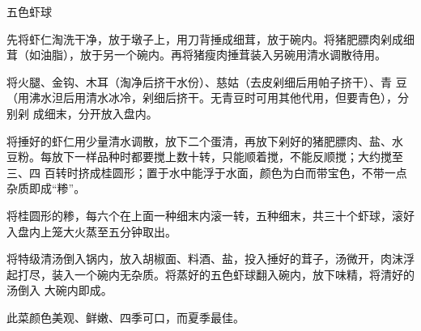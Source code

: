 \begin{recipe}{五色虾球}

\ingredients


\preparation

\step 先将虾仁淘洗干净，放于墩子上，用刀背捶成细茸，放于碗内。将猪肥膘肉剁成细
茸（如油脂），放于另一个碗内。再将猪瘦肉捶茸装入另碗用清水调散待用。

\step 将火腿、金钩、木耳（淘净后挤干水份）、慈姑（去皮剁细后用帕子挤干）、青
豆（用沸水泹后用清水冰冷，剁细后挤干。无青豆时可用其他代用，但要青色），分别剁
成细末，分开放入盘内。

\step 将捶好的虾仁用少量清水调散，放下二个蛋清，再放下剁好的猪肥膘肉、盐、水
豆粉。每放下一样品种时都要搅上数十转，只能顺着搅，不能反顺搅；大约搅至三、四
百转时挤成桂圆形；置于水中能浮于水面，颜色为白而带宝色，不带一点杂质即成“糁”。

\step 将桂圆形的糁，每六个在上面一种细末内滚一转，五种细末，共三十个虾球，滚好
入盘内上笼大火蒸至五分钟取出。

\step 将特级清汤倒入锅内，放入胡椒面、料酒、盐，投入捶好的茸子，汤微开，肉沫浮
起打尽，装入一个碗内无杂质。将蒸好的五色虾球翻入碗内，放下味精，将清好的汤倒入
大碗内即成。

\features

此菜颜色美观、鲜嫩、四季可口，而夏季最佳。

\end{recipe}

